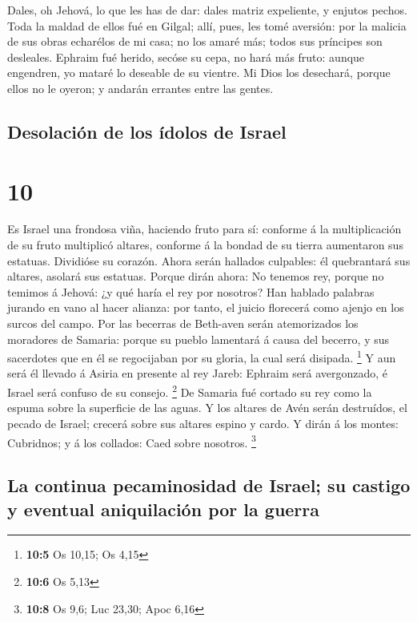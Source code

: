  Dales, oh Jehová, lo que les has de dar: dales matriz
expeliente, y enjutos pechos.  Toda la maldad de ellos fué
en Gilgal; allí, pues, les tomé aversión: por la malicia de sus obras
echarélos de mi casa; no los amaré más; todos sus príncipes son
desleales.  Ephraim fué herido, secóse su cepa, no hará más
fruto: aunque engendren, yo mataré lo deseable de su vientre.
 Mi Dios los desechará, porque ellos no le oyeron; y
andarán errantes entre las gentes.

\hypertarget{desolaciuxf3n-de-los-uxeddolos-de-israel}{%
\subsection{Desolación de los ídolos de
Israel}\label{desolaciuxf3n-de-los-uxeddolos-de-israel}}

\hypertarget{section-9}{%
\section{10}\label{section-9}}

 Es Israel una frondosa viña, haciendo fruto para sí:
conforme á la multiplicación de su fruto multiplicó altares, conforme á
la bondad de su tierra aumentaron sus estatuas.  Dividióse
su corazón. Ahora serán hallados culpables: él quebrantará sus altares,
asolará sus estatuas.  Porque dirán ahora: No tenemos rey,
porque no temimos á Jehová: ¿y qué haría el rey por nosotros?
 Han hablado palabras jurando en vano al hacer alianza: por
tanto, el juicio florecerá como ajenjo en los surcos del campo.
 Por las becerras de Beth-aven serán atemorizados los
moradores de Samaria: porque su pueblo lamentará á causa del becerro, y
sus sacerdotes que en él se regocijaban por su gloria, la cual será
disipada. \footnote{\textbf{10:5} Os 10,15; Os 4,15}  Y aun
será él llevado á Asiria en presente al rey Jareb: Ephraim será
avergonzado, é Israel será confuso de su consejo. \footnote{\textbf{10:6}
  Os 5,13}  De Samaria fué cortado su rey como la espuma
sobre la superficie de las aguas.  Y los altares de Avén
serán destruídos, el pecado de Israel; crecerá sobre sus altares espino
y cardo. Y dirán á los montes: Cubridnos; y á los collados: Caed sobre
nosotros. \footnote{\textbf{10:8} Os 9,6; Luc 23,30; Apoc 6,16}

\hypertarget{la-continua-pecaminosidad-de-israel-su-castigo-y-eventual-aniquilaciuxf3n-por-la-guerra}{%
\subsection{La continua pecaminosidad de Israel; su castigo y eventual
aniquilación por la
guerra}\label{la-continua-pecaminosidad-de-israel-su-castigo-y-eventual-aniquilaciuxf3n-por-la-guerra}}

